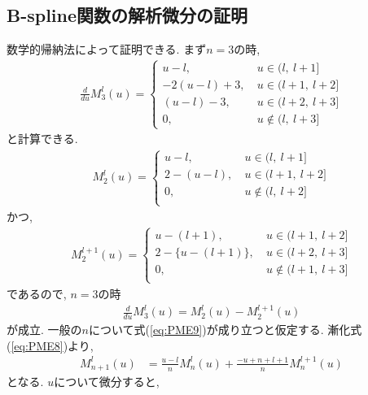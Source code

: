 \subsection{B-spline関数の解析微分の証明}
数学的帰納法によって証明できる.
まず$n=3$の時,
\begin{align}
\frac{d}{du} M_{3}^{l}(u)
=
  \begin{cases}
    u-l,~        & u \in    (l,~   l+1] \\
    -2(u-l)+3,~  & u \in    (l+1,~ l+2] \\
    (u-l)-3,~    & u \in    (l+2,~ l+3] \\
    0,~          & u \notin (l,  ~ l+3]
   \end{cases}
\end{align}
と計算できる.
\begin{align}
  M_{2}^{l}(u)
=
  \begin{cases}
   u-l,~      & u \in    (l,~   l+1] \\
   2-(u-l),~  & u \in    (l+1,~ l+2] \\
   0,~        & u \notin (l,~   l+2] \\
  \end{cases}
\end{align}
かつ,
\begin{align}
  M_{2}^{l+1}(u)
=
  \begin{cases}
   u-(l+1),~        & u \in    (l+1,~ l+2] \\
   2-\{u-(l+1)\},~  & u \in    (l+2,~ l+3] \\
   0,~              & u \notin (l+1,~ l+3] \\
  \end{cases}
\end{align}
であるので, $n=3$の時
\begin{align}
 \frac{d}{du} M_{3}^{l}(u) = M_{2}^{l}(u) - M_{2}^{l+1}(u)
\end{align}
が成立. 一般の$n$について式(\ref{eq:PME9})が成り立つと仮定する.
漸化式(\ref{eq:PME8})より,
\begin{align}
  M_{n+1}^{l}(u)
&=
  \frac{u-l}{n} M_{n}^{l} (u) + \frac{-u+n+l+1}{n} M_{n}^{l+1} (u)
\end{align}
となる. $u$について微分すると,
